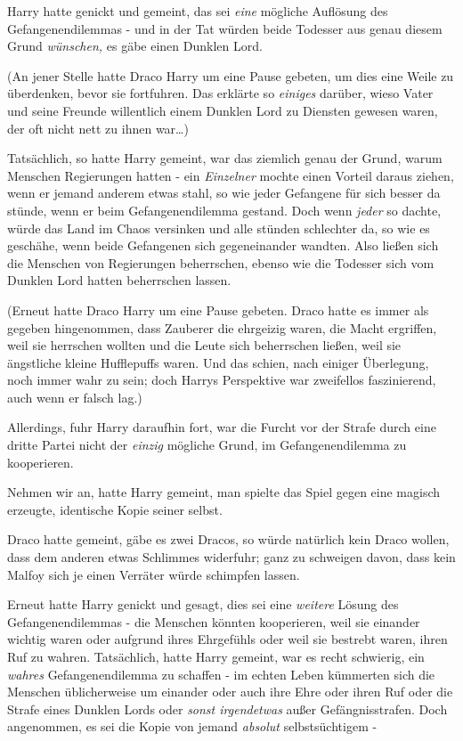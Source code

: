 {Harry hatte genickt und gemeint, das sei \emph{eine} mögliche Auflösung des Gefangenendilemmas - und in der Tat würden beide Todesser aus genau diesem Grund \emph{wünschen,} es gäbe einen Dunklen Lord.

(An jener Stelle hatte Draco Harry um eine Pause gebeten, um dies eine Weile zu überdenken, bevor sie fortfuhren. Das erklärte so \emph{einiges} darüber, wieso Vater und seine Freunde willentlich einem Dunklen Lord zu Diensten gewesen waren, der oft nicht nett zu ihnen war…)

Tatsächlich, so hatte Harry gemeint, war das ziemlich genau der Grund, warum Menschen Regierungen hatten - ein \emph{Einzelner} mochte einen Vorteil daraus ziehen, wenn er jemand anderem etwas stahl, so wie jeder Gefangene für sich besser da stünde, wenn er beim Gefangenendilemma gestand. Doch wenn \emph{jeder} so dachte, würde das Land im Chaos versinken und alle stünden schlechter da, so wie es geschähe, wenn beide Gefangenen sich gegeneinander wandten. Also ließen sich die Menschen von Regierungen beherrschen, ebenso wie die Todesser sich vom Dunklen Lord hatten beherrschen lassen.

(Erneut hatte Draco Harry um eine Pause gebeten. Draco hatte es immer als gegeben hingenommen, dass Zauberer die ehrgeizig waren, die Macht ergriffen, weil sie herrschen wollten und die Leute sich beherrschen ließen, weil sie ängstliche kleine Hufflepuffs waren. Und das schien, nach einiger Überlegung, noch immer wahr zu sein; doch Harrys Perspektive war zweifellos faszinierend, auch wenn er falsch lag.)

Allerdings, fuhr Harry daraufhin fort, war die Furcht vor der Strafe durch eine dritte Partei nicht der \emph{einzig} mögliche Grund, im Gefangenendilemma zu kooperieren.

Nehmen wir an, hatte Harry gemeint, man spielte das Spiel gegen eine magisch erzeugte, identische Kopie seiner selbst.

Draco hatte gemeint, gäbe es zwei Dracos, so würde natürlich kein Draco wollen, dass dem anderen etwas Schlimmes widerfuhr; ganz zu schweigen davon, dass kein Malfoy sich je einen Verräter würde schimpfen lassen.

Erneut hatte Harry genickt und gesagt, dies sei eine \emph{weitere} Lösung des Gefangenendilemmas - die Menschen könnten kooperieren, weil sie einander wichtig waren oder aufgrund ihres Ehrgefühls oder weil sie bestrebt waren, ihren Ruf zu wahren. Tatsächlich, hatte Harry gemeint, war es recht schwierig, ein \emph{wahres} Gefangenendilemma zu schaffen - im echten Leben kümmerten sich die Menschen üblicherweise um einander oder auch ihre Ehre oder ihren Ruf oder die Strafe eines Dunklen Lords oder \emph{sonst irgendetwas} außer Gefängnisstrafen. Doch angenommen, es sei die Kopie von jemand \emph{absolut} selbstsüchtigem -

}
